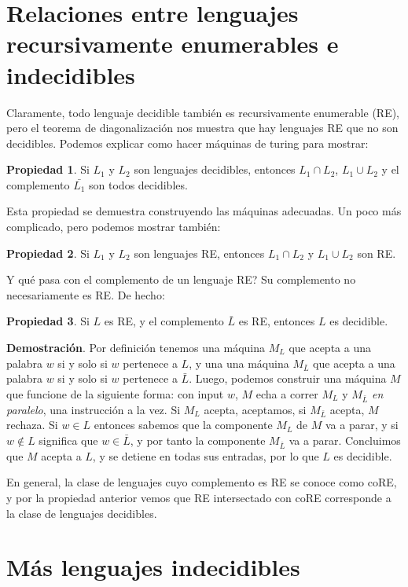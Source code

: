 \documentclass[12pt]{article}
\begin{document}
\section{Relaciones entre lenguajes recursivamente enumerables e indecidibles}

Claramente, todo lenguaje decidible también es recursivamente enumerable (RE), pero el teorema de diagonalización nos muestra que hay lenguajes RE que no son decidibles. 
Podemos explicar como hacer máquinas de turing para mostrar: 

\medskip
\noindent
\textbf{Propiedad 1}. Si $L_1$ y $L_2$ son lenguajes decidibles, entonces $L_1 \cap L_2$, $L_1 \cup L_2$ y el complemento $\bar{L_1}$ son todos decidibles. 

\bigskip
Esta propiedad se demuestra construyendo las máquinas adecuadas. Un poco más complicado, pero podemos mostrar también:

\medskip
\noindent
\textbf{Propiedad 2}. Si $L_1$ y $L_2$ son lenguajes RE, entonces $L_1 \cap L_2$ y $L_1 \cup L_2$ son RE. 

\bigskip

Y qué pasa con el complemento de un lenguaje RE? Su complemento no necesariamente es RE. De hecho: 

\medskip
\noindent
\textbf{Propiedad 3}. Si $L$ es RE, y el complemento $\bar L$ es RE, entonces $L$ es decidible. 

\medskip
\noindent
\textbf{Demostración}. Por definición tenemos una máquina $M_L$ que acepta a una palabra $w$ si y solo si $w$ pertenece a $L$, y una  
una máquina $M_{\bar L}$ que acepta a una palabra $w$ si y solo si $w$ pertenece a $\bar{L}$. Luego, podemos construir una máquina $M$ que funcione de la siguiente forma: 
con input $w$, $M$ echa a correr $M_L$ y $M_{\bar L}$ \emph{en paralelo}, una instrucción a la vez. Si $M_L$ acepta, aceptamos, si $M_{\bar L}$ acepta, $M$ rechaza. 
Si $w \in L$ entonces sabemos que la componente $M_L$ de $M$ va a parar, y si 
$w \notin L$ significa que $w \in \bar L$, y por tanto la componente $M_{\bar L}$ va a parar. Concluimos que $M$ acepta a $L$, y se detiene en todas sus entradas, por lo que $L$ es decidible. 

\medskip

En general, la clase de lenguajes cuyo complemento es RE se conoce como coRE, y por la propiedad anterior vemos que RE intersectado con coRE corresponde a la clase 
de lenguajes decidibles. 


\section{Más lenguajes indecidibles}
\end{document}
